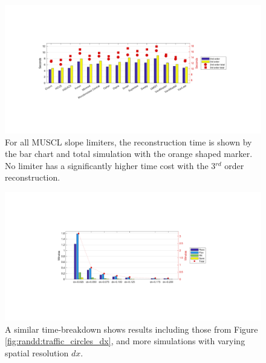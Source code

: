 	\begin{figure}[H]
    		\centering
        		\includegraphics[trim=135 135 135 150,clip,width=\textwidth]{Time_TC_limiters.pdf}
		\caption[Time Analysis : Traffic circle slope limiters]{For all MUSCL slope limiters, the reconstruction time is shown by the bar chart and total simulation with the orange shaped marker. No limiter has a significantly higher time cost with the 3$^{rd}$ order reconstruction.}
		\label{fig:randd:Time:traffic_circles:limiters}
	\end{figure}
	
	\begin{figure}[H]
    		\centering
        		\includegraphics[trim=210 150 220 150,clip,width=\textwidth]{Time_TC_grid.pdf}
		\caption[Time Analysis : Spatial resolution]{A similar time-breakdown shows results including those from Figure \ref{fig:randd:traffic_circles_dx}, and more simulations with varying spatial resolution $dx$.}
		\label{fig:randd:Time:traffic_circles:grid}
	\end{figure}
	
	\pagebreak
	
